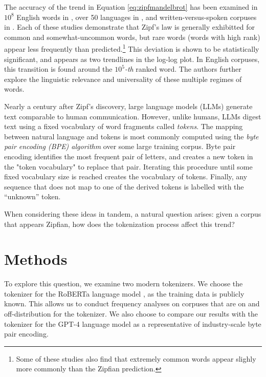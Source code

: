 \documentclass[11pt]{article}
\begin{document}
The accuracy of the trend in Equation \ref{eq:zipfmandelbrot} has been examined in $10^8$ English words in \cite{cancho2000}, over 50 languages in \cite{yu2018zipfslaw50languages}, and written-versus-spoken corpuses in \cite{lin2015scalinglawshumanspeech}. Each of these studies demonstrate that Zipf's law is generally exhibitted for common and somewhat-uncommon words, but rare words (words with high rank) appear less frequently than predicted.\footnote{Some of these studies also find that extremely common words appear slighly more commonly than the Zipfian prediction.} This deviation is shown to be statistically significant, and appears as two trendlines in the log-log plot. In English corpuses, this transition is found around the $10^5$\textit{-th} ranked word. The authors further explore the linguistic relevance and universality of these multiple regimes of words. 

Nearly a century after Zipf's discovery, large language models (LLMs) generate text comparable to human communication. However, unlike humans, LLMs digest text using a fixed vocabulary of word fragments called \textit{tokens}. The mapping between natural language and tokens is most commonly computed using the \textit{byte pair encoding (BPE) algorithm} \cite{bpegage} over some large training corpus. Byte pair encoding identifies the most frequent pair of letters, and creates a new token in the "token vocabulary" to replace that pair. Iterating this procedure until some fixed vocabulary size is reached creates the vocabulary of tokens. Finally, any sequence that does not map to one of the derived tokens is labelled with the ``unknown'' token.

When considering these ideas in tandem, a natural question arises: given a corpus that appears Zipfian, how does the tokenization process affect this trend?

\section{Methods}

To explore this question, we examine two modern tokenizers. We choose the tokenizer for the RoBERTa language model \cite{liu2019robertarobustlyoptimizedbert}, as the training data is publicly known. This allows us to conduct frequency analyses on corpuses that are on and off-distribution for the tokenizer. We also choose to compare our results with the tokenizer for the GPT-4 language model \cite{openai2024gpt4technicalreport} as a representative of industry-scale byte pair encoding. 
\end{document}
